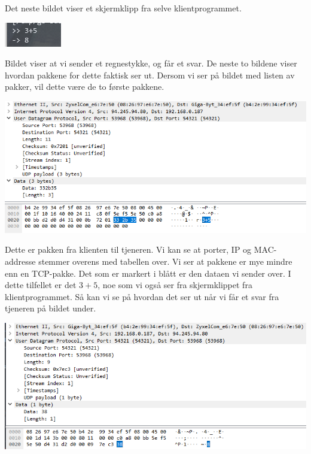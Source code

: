 \documentclass[12pt]{article}
\begin{document}
    Det neste bildet viser et skjermklipp fra selve klientprogrammet.
    
    \begin{center}
        \includegraphics{assets/8kkg5An.png}
    \end{center}

    Bildet viser at vi sender et regnestykke, og får et svar. De neste to bildene viser hvordan 
    pakkene for dette faktisk ser ut. Dersom vi ser på bildet med listen av pakker, vil dette 
    være de to første pakkene.

    \begin{center}
        \includegraphics[width=\linewidth]{assets/46A9fBV.png}
    \end{center}
    
    Dette er pakken fra klienten til tjeneren. Vi kan se at porter, IP og MAC-addresse stemmer 
    overens med tabellen over. Vi ser at pakkene er mye mindre enn en TCP-pakke. Det som er 
    markert i blått er den dataen vi sender over. I dette tilfellet er det $3+5$, noe som vi 
    også ser fra skjermklippet fra klientprogrammet. Så kan vi se på hvordan det ser ut når 
    vi får et svar fra tjeneren på bildet under.

    \begin{center}
        \includegraphics[width=\linewidth]{assets/3oYp41n.png}
    \end{center}
\end{document}
